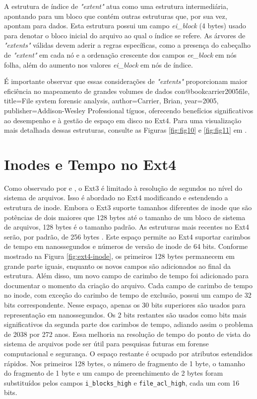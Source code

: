 \documentclass[
	12pt,				%
	openright,			%
	oneside,			%
	a4paper,			%
	chapter=TITLE,		%
	english,			%
	french,				%
	spanish,			%
	brazil				%
	]{abntex2}
\theoremstyle{definition}
\begin{document}
A estrutura de índice 
de \textit{"extent"} atua como uma estrutura intermediária, apontando para um bloco que 
contém outras estruturas que, por sua vez, apontam para dados. Esta estrutura possui um campo
\textit{ei\_block} (4 bytes) usado para denotar o bloco inicial do arquivo ao qual o índice se 
refere. As árvores de \textit{"extents"} válidas devem aderir a regras específicas, 
como a presença do cabeçalho de \textit{"extent"} em cada nó e a ordenação crescente dos 
campos \textit{ee\_block} em nós folha, além do aumento nos valores \textit{ei\_block} em nós de índice.

É importante observar que essas considerações de \textit{"extents"} proporcionam maior eficiência 
no mapeamento de grandes volumes de dados con@book{carrier2005file,
title={File system forensic analysis},
author={Carrier, Brian},
year={2005},
publisher={Addison-Wesley Professional}
}tíguos, oferecendo benefícios significativos ao 
desempenho e à gestão de espaço em disco no Ext4. Para uma visualização mais detalhada dessas 
estruturas, consulte as Figuras \ref{fig:fig10} e \ref{fig:fig11} em \cite{matur}.

\section{Inodes e Tempo no Ext4}

Como observado por \cite{matur} e \cite{xia}, o Ext3 é limitado à resolução de segundos 
no nível do sistema de arquivos. Isso é abordado no Ext4 modificando e estendendo a estrutura de 
inode. Embora o Ext3 suporte tamanhos diferentes de inode que são potências de dois maiores que 128 
bytes até o tamanho de um bloco de sistema de arquivos, 128 bytes é o tamanho padrão. As estruturas 
mais recentes no Ext4 serão, por padrão, de 256 bytes \cite{matur}. Este espaço permite ao 
Ext4 suportar carimbos de tempo em nanossegundos e números de versão de inode de 64 bits. 
Conforme mostrado na Figura \ref{fig:ext4-inode}, os primeiros 128 bytes permanecem em 
grande parte iguais, enquanto os novos campos são adicionados ao final da estrutura. 
Além disso, um novo campo de carimbo de tempo foi adicionado para documentar o momento 
da criação do arquivo. Cada campo de carimbo de tempo no inode, com exceção do carimbo de tempo de 
exclusão, possui um campo de 32 bits correspondente. Nesse espaço, apenas os 30 bits superiores são 
usados para representação em nanossegundos. Os 2 bits restantes são usados como bits mais significativos 
da segunda parte dos carimbos de tempo, adiando assim o problema de 2038 por 272 anos. 
Essa melhoria na resolução de tempo do ponto de vista do sistema de arquivos pode ser 
útil para pesquisas futuras em forense computacional e segurança. O espaço restante é 
ocupado por atributos estendidos rápidos. Nos primeiros 128 bytes, o número de fragmento 
de 1 byte, o tamanho do fragmento de 1 byte e um campo de preenchimento de 2 bytes foram 
substituídos pelos campos \texttt{i\_blocks\_high} e \texttt{file\_acl\_high}, cada um com 16 bits.
\end{document}
